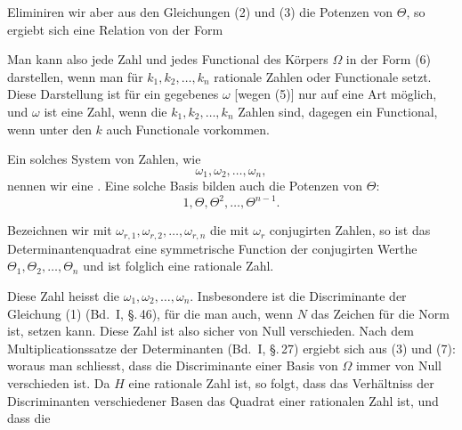 
Eliminiren wir aber aus den Gleichungen (2) und (3) die Potenzen von $\Theta$, so ergiebt sich eine Relation von der Form

Man kann also jede Zahl und jedes Functional des Körpers $\Omega$ in der Form (6) darstellen, wenn man für $k_1, k_2, \ldots, k_n$ rationale Zahlen oder Functionale setzt. Diese Darstellung ist für ein gegebenes $\omega$ [wegen (5)] nur auf eine Art möglich, und $\omega$ ist eine Zahl, wenn die $k_1, k_2, \ldots, k_n$ Zahlen sind, dagegen ein Functional, wenn unter den $k$ auch Functionale vorkommen.

Ein solches System von Zahlen, wie
\[
\omega_1, \omega_2, \ldots, \omega_n,
\]
nennen wir eine . Eine solche Basis bilden auch die Potenzen von $\Theta$:
\[
1, \Theta, \Theta^2, \ldots, \Theta^{n-1}.
\]

Bezeichnen wir mit $\omega_{r,1}, \omega_{r,2}, \ldots, \omega_{r,n}$ die mit $\omega_r$ conjugirten Zahlen, so ist das Determinantenquadrat
eine symmetrische Function der conjugirten Werthe $\Theta_1, \Theta_2, \ldots, \Theta_n$ und ist folglich eine rationale Zahl.

Diese Zahl heisst die  $\omega_1, \omega_2, \ldots, \omega_n$. Insbesondere ist
die Discriminante der Gleichung (1) (Bd.\ I, \S.\,46), für die man auch, wenn $N$ das Zeichen für die Norm ist,
setzen kann. Diese Zahl ist also sicher von Null verschieden. Nach dem Multiplicationssatze der Determinanten (Bd.\ I, \S.\,27) ergiebt sich aus (3) und (7):
woraus man schliesst, dass die Discriminante einer Basis von $\Omega$ immer von Null verschieden ist. Da $H$ eine rationale Zahl ist, so folgt, dass das Verhältniss der Discriminanten verschiedener Basen das Quadrat einer rationalen Zahl ist, und dass die
